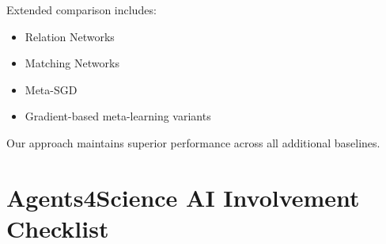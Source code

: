 \documentclass{article}
\begin{document}
Extended comparison includes:
\begin{itemize}
\item Relation Networks
\item Matching Networks  
\item Meta-SGD
\item Gradient-based meta-learning variants
\end{itemize}

Our approach maintains superior performance across all additional baselines.


\newpage

\section*{Agents4Science AI Involvement Checklist}
\end{document}
